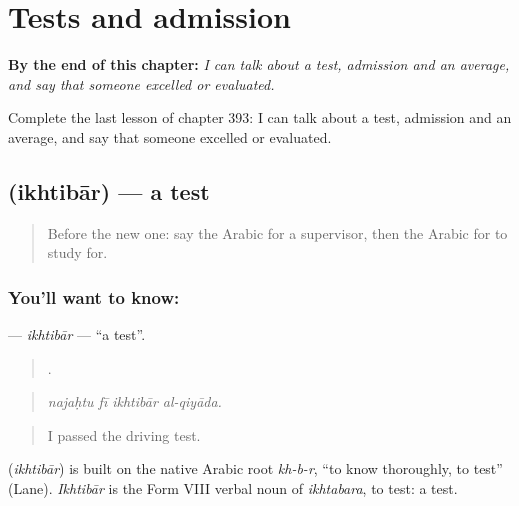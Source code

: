 
\chapter{Tests and admission}
\label{ch:ar-tests-and-admission}

\begin{chapteropening}
\textbf{By the end of this chapter:} \emph{I can talk about a test, admission and an average, and say that someone excelled or evaluated.}

Complete the last lesson of chapter 393: I can talk about a test, admission and an average, and say that someone excelled or evaluated.
\end{chapteropening}

\section[\texorpdfstring{\ar{اختبار} (ikhtibār)}{اختبار (ikhtibār)}]{ (ikhtibār) — a test}

\label{lesson:AR-C393-ikhtibar}



\begin{quote}
Before the new one: say the Arabic for a supervisor, then the Arabic for to study for.
\end{quote}

\subsection*{You'll want to know: }
\textbf{} — \emph{ikhtibār} — \textquotedblleft{}a test\textquotedblright{}.

\begin{quote}
   .
\end{quote}

\begin{quote}
\emph{najaḥtu fī ikhtibār al-qiyāda.}
\end{quote}

\begin{quote}
I passed the driving test.
\end{quote}

\begin{cousinweb}
\textbf{} (\emph{ikhtibār}) is built on the native Arabic root \emph{kh-b-r}, \textquotedblleft{}to know thoroughly, to test\textquotedblright{} (Lane). \emph{Ikhtibār} is the Form VIII verbal noun of \emph{ikhtabara}, to test: a test.
\end{cousinweb}

